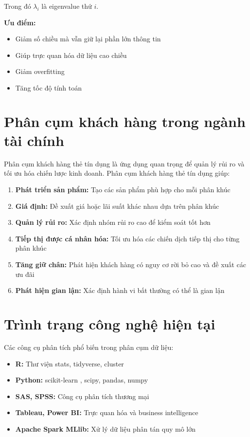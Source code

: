 Trong đó $\lambda_i$ là eigenvalue thứ $i$.

\textbf{Ưu điểm:}
\begin{itemize}
    \item Giảm số chiều mà vẫn giữ lại phần lớn thông tin
    \item Giúp trực quan hóa dữ liệu cao chiều
    \item Giảm overfitting
    \item Tăng tốc độ tính toán
\end{itemize}

\section{Phân cụm khách hàng trong ngành tài chính}

Phân cụm khách hàng thẻ tín dụng \cite{customer_segmentation_review, financial_segmentation} là ứng dụng quan trọng để quản lý rủi ro \cite{credit_risk} và tối ưu hóa chiến lược kinh doanh. Phân cụm khách hàng thẻ tín dụng giúp:

\begin{enumerate}
    \item \textbf{Phát triển sản phẩm:} Tạo các sản phẩm phù hợp cho mỗi phân khúc
    
    \item \textbf{Giá định:} Đề xuất giá hoặc lãi suất khác nhau dựa trên phân khúc
    
    \item \textbf{Quản lý rủi ro:} Xác định nhóm rủi ro cao để kiểm soát tốt hơn
    
    \item \textbf{Tiếp thị được cá nhân hóa:} Tối ưu hóa các chiến dịch tiếp thị cho từng phân khúc
    
    \item \textbf{Tăng giữ chân:} Phát hiện khách hàng có nguy cơ rời bỏ cao và đề xuất các ưu đãi
    
    \item \textbf{Phát hiện gian lận:} Xác định hành vi bất thường có thể là gian lận
\end{enumerate}

\section{Trình trạng công nghệ hiện tại}

Các công cụ phân tích phổ biến trong phân cụm dữ liệu:
\begin{itemize}
    \item \textbf{R:} Thư viện stats, tidyverse, cluster
    \item \textbf{Python:} scikit-learn \cite{scikit_learn}, scipy, pandas, numpy
    \item \textbf{SAS, SPSS:} Công cụ phân tích thương mại
    \item \textbf{Tableau, Power BI:} Trực quan hóa và business intelligence
    \item \textbf{Apache Spark MLlib:} Xử lý dữ liệu phân tán quy mô lớn
\end{itemize}

